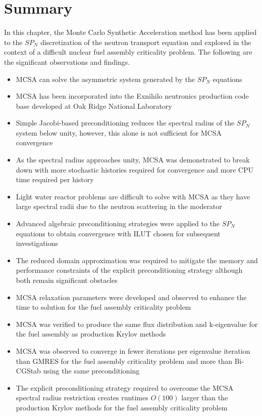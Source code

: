\clearpage

\section{Summary\ }
\label{sec:mc_summary}

In this chapter, the Monte Carlo Synthetic Acceleration method has
been applied to the $SP_N$ discretization of the neutron transport
equation and explored in the context of a difficult nuclear fuel
assembly criticality problem. The following are the significant
observations and findings.

\begin{itemize}
\item MCSA can solve the asymmetric system generated by the $SP_N$
  equations
\item MCSA has been incorporated into the Exnihilo neutronics
  production code base developed at Oak Ridge National Laboratory
\item Simple Jacobi-based preconditioning reduces the spectral radius
  of the $SP_N$ system below unity, however, this alone is not
  sufficient for MCSA convergence
\item As the spectral radius approaches unity, MCSA was demonstrated
  to break down with more stochastic histories required for
  convergence and more CPU time required per history
\item Light water reactor problems are difficult to solve with MCSA as
  they have large spectral radii due to the neutron scattering in the
  moderator
\item Advanced algebraic preconditioning strategies were applied to
  the $SP_N$ equations to obtain convergence with ILUT chosen for
  subsequent investigations
\item The reduced domain approximation was required to mitigate the
  memory and performance constraints of the explicit preconditioning
  strategy although both remain significant obstacles
\item MCSA relaxation parameters were developed and observed to
  enhance the time to solution for the fuel assembly criticality
  problem
\item MCSA was verified to produce the same flux distribution and
  k-eigenvalue for the fuel assembly as production Krylov methods
\item MCSA was observed to converge in fewer iterations per eigenvalue
  iteration than GMRES for the fuel assembly criticality problem and
  more than Bi-CGStab using the same preconditioning
\item The explicit preconditioning strategy required to overcome the
  MCSA spectral radius restriction creates runtimes $O(100)$ larger
  than the production Krylov methods for the fuel assembly criticality
  problem
\end{itemize}
